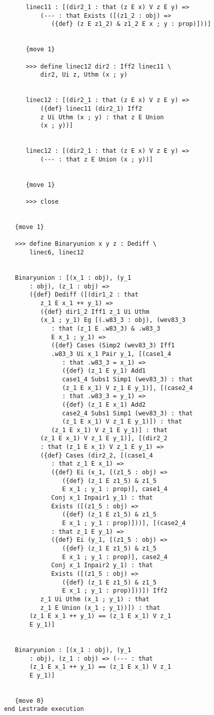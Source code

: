 \documentclass[12pt]{article}
\begin{document}
\begin{verbatim}
      linec11 : [(dir2_1 : that (z E x) V z E y) => 
          (--- : that Exists ([(z1_2 : obj) => 
             ({def} (z E z1_2) & z1_2 E x ; y : prop)]))]


      {move 1}

      >>> define linec12 dir2 : Iff2 linec11 \
          dir2, Ui z, Uthm (x ; y)


      linec12 : [(dir2_1 : that (z E x) V z E y) => 
          ({def} linec11 (dir2_1) Iff2 
          z Ui Uthm (x ; y) : that z E Union 
          (x ; y))]


      linec12 : [(dir2_1 : that (z E x) V z E y) => 
          (--- : that z E Union (x ; y))]


      {move 1}

      >>> close


   {move 1}

   >>> define Binaryunion x y z : Dediff \
       linec6, linec12


   Binaryunion : [(x_1 : obj), (y_1 
       : obj), (z_1 : obj) => 
       ({def} Dediff ([(dir1_2 : that 
          z_1 E x_1 ++ y_1) => 
          ({def} dir1_2 Iff1 z_1 Ui Uthm 
          (x_1 ; y_1) Eg [(.w83_3 : obj), (wev83_3 
             : that (z_1 E .w83_3) & .w83_3 
             E x_1 ; y_1) => 
             ({def} Cases (Simp2 (wev83_3) Iff1 
             .w83_3 Ui x_1 Pair y_1, [(case1_4 
                : that .w83_3 = x_1) => 
                ({def} (z_1 E y_1) Add1 
                case1_4 Subs1 Simp1 (wev83_3) : that 
                (z_1 E x_1) V z_1 E y_1)], [(case2_4 
                : that .w83_3 = y_1) => 
                ({def} (z_1 E x_1) Add2 
                case2_4 Subs1 Simp1 (wev83_3) : that 
                (z_1 E x_1) V z_1 E y_1)]) : that 
             (z_1 E x_1) V z_1 E y_1)] : that 
          (z_1 E x_1) V z_1 E y_1)], [(dir2_2 
          : that (z_1 E x_1) V z_1 E y_1) => 
          ({def} Cases (dir2_2, [(case1_4 
             : that z_1 E x_1) => 
             ({def} Ei (x_1, [(z1_5 : obj) => 
                ({def} (z_1 E z1_5) & z1_5 
                E x_1 ; y_1 : prop)], case1_4 
             Conj x_1 Inpair1 y_1) : that 
             Exists ([(z1_5 : obj) => 
                ({def} (z_1 E z1_5) & z1_5 
                E x_1 ; y_1 : prop)]))], [(case2_4 
             : that z_1 E y_1) => 
             ({def} Ei (y_1, [(z1_5 : obj) => 
                ({def} (z_1 E z1_5) & z1_5 
                E x_1 ; y_1 : prop)], case2_4 
             Conj x_1 Inpair2 y_1) : that 
             Exists ([(z1_5 : obj) => 
                ({def} (z_1 E z1_5) & z1_5 
                E x_1 ; y_1 : prop)]))]) Iff2 
          z_1 Ui Uthm (x_1 ; y_1) : that 
          z_1 E Union (x_1 ; y_1))]) : that 
       (z_1 E x_1 ++ y_1) == (z_1 E x_1) V z_1 
       E y_1)]


   Binaryunion : [(x_1 : obj), (y_1 
       : obj), (z_1 : obj) => (--- : that 
       (z_1 E x_1 ++ y_1) == (z_1 E x_1) V z_1 
       E y_1)]


   {move 0}
end Lestrade execution
\end{verbatim}
\end{document}
